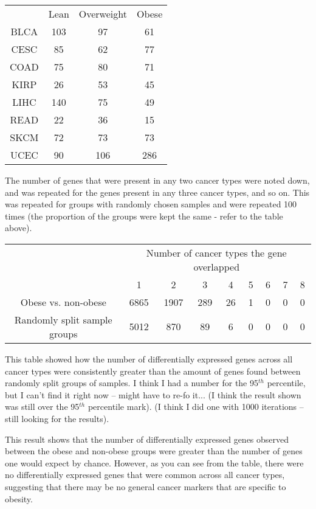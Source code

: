 \documentclass[a4paper, 11pt]{article}
\begin{document}
\begin{center}
	\begin{tabular}{cccc}
             & Lean & Overweight & Obese \\
		BLCA & 103    & 97         & 61 \\
		CESC & 85     & 62         & 77 \\
		COAD & 75     & 80         & 71 \\
		KIRP & 26     & 53         & 45 \\
		LIHC & 140    & 75         & 49 \\
		READ & 22     & 36         & 15 \\
		SKCM & 72     & 73         & 73 \\
		UCEC & 90     & 106        & 286 \\
	\end{tabular}
\end{center}

The number of genes that were present in any two cancer types were noted down, and was repeated for the genes present in any three cancer types, and so on.
This was repeated for groups with randomly chosen samples and were repeated 100 times (the proportion of the groups were kept the same - refer to the table above).

\begin{center}
	\begin{tabular}{ccccccccc}
		& \multicolumn{8}{c}{Number of cancer types the gene overlapped} \\
                                     &    1 &    2 &   3 &  4 & 5 & 6 & 7 & 8 \\
		\midrule
		         Obese vs. non-obese & 6865 & 1907 & 289 & 26 & 1 & 0 & 0 & 0 \\
		Randomly split sample groups & 5012 &  870 &  89 &  6 & 0 & 0 & 0 & 0 \\
	\end{tabular}
\end{center}

This table showed how the number of differentially expressed genes across all cancer types were consistently greater  than the amount of genes found between randomly split groups of samples.
I think I had a number for the 95$^{th}$ percentile, but I can't find it right now -- might have to re-fo it... (I think the result shown was still over the 95$^{th}$ percentile mark).
(I think I did one with 1000 iterations -- still looking for the results).

This result shows that the number of differentially expressed genes observed between the obese and non-obese groups were greater than the number of genes one would expect by chance.
However, as you can see from the table, there were no differentially expressed genes that were common across all cancer types, suggesting that there may be no general cancer markers that are specific to obesity.\\
\end{document}
